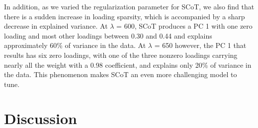 \documentclass[11pt,letterpaper]{report}
\begin{document}
In addition, as we varied the regularization parameter for SCoT, we also find that there is a sudden increase in loading sparsity, which is accompanied by a sharp decrease in explained variance. At $\lambda$ = 600, SCoT produces a PC 1 with one zero loading and most other loadings between 0.30 and 0.44 and explains approximately 60\% of variance in the data. At $\lambda$ = 650 however, the PC 1 that results has six zero loadings, with one of the three nonzero loadings carrying nearly all the weight with a 0.98 coefficient, and explains only 20\% of variance in the data. This phenomenon makes SCoT an even more challenging model to tune. 

\section*{Discussion}

%
%


\pagebreak



\pagebreak
\appendix
\end{document}
